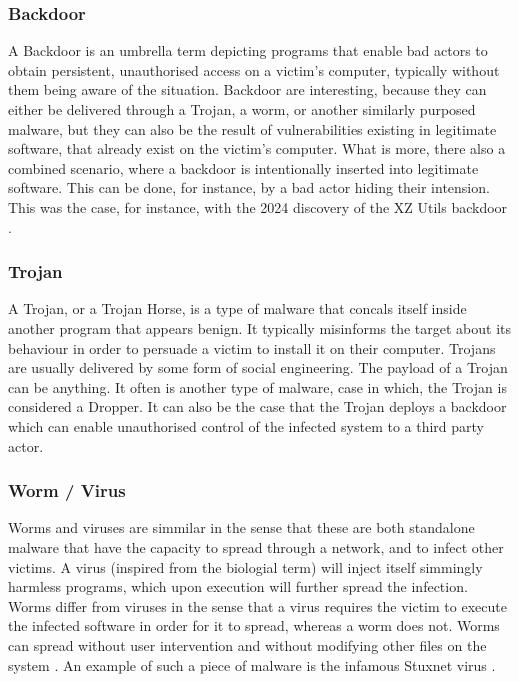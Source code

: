 \subsubsection{Backdoor}

A Backdoor is an umbrella term depicting programs that enable bad actors to obtain persistent, unauthorised access on a victim's computer, typically without them being aware of the situation. Backdoor are interesting, because they can either be delivered through a Trojan, a worm, or another similarly purposed malware, but they can also be the result of vulnerabilities existing in legitimate software, that already exist on the victim's computer. What is more, there also a combined scenario, where a backdoor is intentionally inserted into legitimate software. This can be done, for instance, by a bad actor hiding their intension. This was the case, for instance, with the 2024 discovery of the XZ Utils backdoor \cite{xz_backdoor}.

\subsubsection{Trojan}

A Trojan, or a Trojan Horse, is a type of malware that concals itself inside another program that appears benign. It typically misinforms the target about its behaviour in order to persuade a victim to install it on their computer. Trojans are usually delivered by some form of social engineering. The payload of a Trojan can be anything. It often is another type of malware, case in which, the Trojan is considered a Dropper. It can also be the case that the Trojan deploys a backdoor which can enable unauthorised control of the infected system to a third party actor.

\subsubsection{Worm / Virus}

Worms and viruses are simmilar in the sense that these are both standalone malware that have the capacity to spread through a network, and to infect other victims. A virus (inspired from the biologial term) will inject itself simmingly harmless programs, which upon execution will further spread the infection. Worms differ from viruses in the sense that a virus requires the victim to execute the infected software in order for it to spread, whereas a worm does not. Worms can spread without user intervention and without modifying other files on the system \cite{wiki_malware}. An example of such a piece of malware is the infamous Stuxnet virus \cite{stuxnet}.

